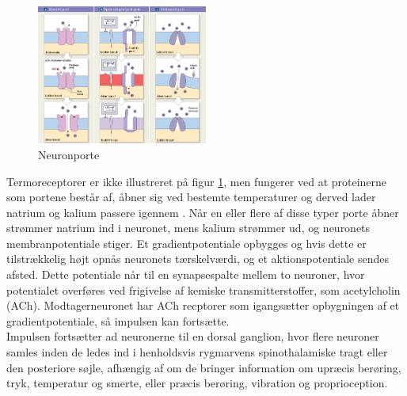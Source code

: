 \begin{figure}[H] 
	\begin{center}
	\includegraphics[width=0.5\textwidth]{figures/neuronport}
	\end{center}
		\caption{Neuronporte \citep{Martini}}
		\label{neuronport}
		\centering
\end{figure}

Termoreceptorer er ikke illustreret på figur \ref{neuronport}, men fungerer ved at proteinerne som portene består af, åbner sig ved bestemte temperaturer og derved lader natrium og kalium passere igennem \citep{kimball}. 
Når en eller flere af disse typer porte åbner strømmer natrium ind i neuronet, mens kalium strømmer ud, og neuronets membranpotentiale stiger. Et gradientpotentiale opbygges og hvis dette er tilstrækkelig højt opnås neuronets tærskelværdi, og et aktionspotentiale sendes afsted. Dette potentiale når til en synapsespalte mellem to neuroner, hvor potentialet overføres ved frigivelse af kemiske transmitterstoffer, som acetylcholin (ACh). Modtagerneuronet har ACh recptorer som igangsætter opbygningen af et gradientpotentiale, så impulsen kan fortsætte. \\
Impulsen fortsætter ad neuronerne til en dorsal ganglion, hvor flere neuroner samles inden de ledes ind i henholdsvis rygmarvens spinothalamiske tragt eller den posteriore søjle, afhængig af om de bringer information om upræcis berøring, tryk, temperatur og smerte, eller præcis berøring, vibration og proprioception. \citep{Martini}


